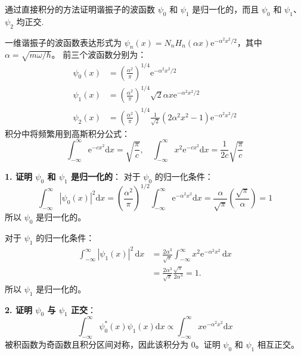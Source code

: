 \begin{exercise}\label{ex:24.6}
通过直接积分的方法证明谐振子的波函数 $\psi_0$ 和 $\psi_1$ 是归一化的，而且 $\psi_0$ 和 $\psi_1$、$\psi_2$ 均正交.
\end{exercise}
\begin{solution}
一维谐振子的波函数表达形式为 $\psi_n(x) = N_n H_n(\alpha x) \mathrm{e}^{-\alpha^2 x^2 / 2}$，其中 $\alpha = \sqrt{m\omega/\hbar}$。
前三个波函数分别为：
\begin{align*}
    \psi_0(x) &= \left( \frac{\alpha^2}{\pi} \right)^{1/4} \mathrm{e}^{-\alpha^2 x^2 / 2} \\
    \psi_1(x) &= \left( \frac{\alpha^2}{\pi} \right)^{1/4} \sqrt{2} \alpha x \mathrm{e}^{-\alpha^2 x^2 / 2} \\
    \psi_2(x) &= \left( \frac{\alpha^2}{\pi} \right)^{1/4} \frac{1}{\sqrt{2}} (2\alpha^2 x^2 - 1) \mathrm{e}^{-\alpha^2 x^2 / 2}
\end{align*}
积分中将频繁用到高斯积分公式：
$$ \int_{-\infty}^{\infty} \mathrm{e}^{-cx^2} \mathrm{d}x = \sqrt{\frac{\pi}{c}}, \quad \int_{-\infty}^{\infty} x^2 \mathrm{e}^{-cx^2} \mathrm{d}x = \frac{1}{2c} \sqrt{\frac{\pi}{c}} $$

\textbf{1. 证明 $\psi_0$ 和 $\psi_1$ 是归一化的}：
对于 $\psi_0$ 的归一化条件：
$$ \int_{-\infty}^{\infty} |\psi_0(x)|^2 \mathrm{d}x = \left( \frac{\alpha^2}{\pi} \right)^{1/2} \int_{-\infty}^{\infty} \mathrm{e}^{-\alpha^2 x^2} \mathrm{d}x = \frac{\alpha}{\sqrt{\pi}} \left( \frac{\sqrt{\pi}}{\alpha} \right) = 1 $$
所以 $\psi_0$ 是归一化的。

对于 $\psi_1$ 的归一化条件：
\[
\begin{aligned}
\int_{-\infty}^{\infty}|\psi_1(x)|^2\,\mathrm{d}x
 &=\frac{2\alpha^3}{\sqrt\pi}
   \int_{-\infty}^{\infty}x^2\mathrm{e}^{-\alpha^2x^2}\,\mathrm{d}x\\
 &=\frac{2\alpha^3}{\sqrt\pi}
   \frac{\sqrt\pi}{2\alpha^3}=1.
\end{aligned}
\]
所以 $\psi_1$ 是归一化的。

\textbf{2. 证明 $\psi_0$ 与 $\psi_1$ 正交}：
$$ \int_{-\infty}^{\infty} \psi_0^*(x) \psi_1(x) \mathrm{d}x \propto \int_{-\infty}^{\infty} x \mathrm{e}^{-\alpha^2 x^2} \mathrm{d}x $$
被积函数为奇函数且积分区间对称，因此该积分为 $0$。证明 $\psi_0$ 和 $\psi_1$ 相互正交。


\end{solution}

